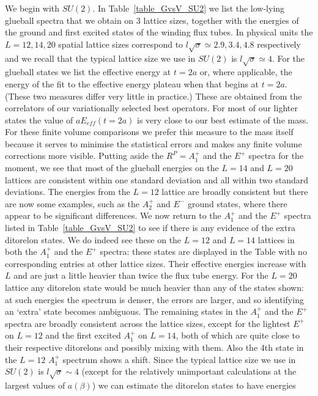 \documentclass[12pt]{article}
\begin{document}
We begin with $SU(2)$. In Table~\ref{table_GvsV_SU2} we list the low-lying glueball spectra
that we obtain on 3 lattice sizes, together with the energies of the ground and
first excited states of the winding flux tubes. In physical units the $L=12,14,20$ spatial
lattice sizes correspond to $l\surd\sigma \simeq 2.9,3.4,4.8$ respectively and we recall
that the typical lattice size we use in $SU(2)$ is $l\surd\sigma \simeq 4$.
For the glueball states we list the
effective energy at $t=2a$ or, where applicable, the energy of the fit to the effective
energy plateau when that begins at $t=2a$. (These two measures differ very little in practice.)
These are obtained from the correlators of our variationally selected best operators.
For most of our lighter states the value of $aE_{eff}(t=2a)$ is very close to our best estimate
of the mass. For these finite volume comparisons we prefer this measure to the mass itself because
it serves to minimise the statistical errors and makes any finite volume corrections more visible.
Putting aside the $R^P=A_1^{+}$ and the $E^{+}$ spectra for the moment, we see that most of the glueball
energies on the $L=14$ and $L=20$ lattices are consistent within one standard deviation and all within
two standard deviations. The energies from the $L=12$ lattice are broadly consistent but there are
now some examples, such as the $A_2^+$ and $E^-$ ground states, where there appear to be significant
differences. We now return to the $A_1^{+}$ and the $E^{+}$ spectra listed in Table~\ref{table_GvsV_SU2}
to see if there is any evidence of the extra ditorelon states. We do indeed see these on the
$L=12$ and $L=14$ lattices in both the $A_1^{+}$ and the $E^{+}$ spectra: these states are displayed
in the Table with no corresponding entries at other lattice sizes. Their
effective energies increase with
$L$ and are just a little heavier than twice the flux tube energy. For the $L=20$ lattice
any ditorelon state would be much heavier than any of the states shown: at such energies the
spectrum is denser, the errors are larger, and so identifying an `extra' state becomes ambiguous.
The remaining states in the $A_1^+$ and the $E^{+}$ spectra are broadly consistent across the
lattice sizes, except for the lightest $E^+$ on $L=12$ and the first excited $A_1^+$ on $L=14$,
both of which are quite close to their respective ditorelons and possibly mixing with them.
Also the 4th state in the $L=12$ $A_1^+$ spectrum shows a shift. Since the typical lattice size we
use in $SU(2)$ is $l\surd\sigma \sim 4$ (except for the relatively unimportant calculations
at the largest values of $a(\beta)$) we can estimate the ditorelon states to have energies
\end{document}
